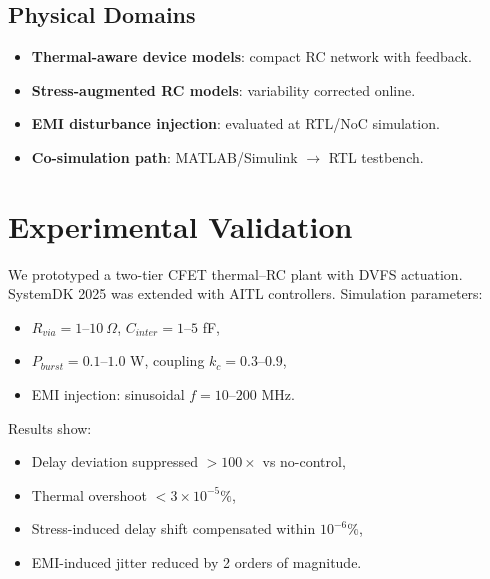 \documentclass[conference]{IEEEtran}
\begin{document}
\subsection{Physical Domains}
\begin{itemize}
  \item \textbf{Thermal-aware device models}: compact RC network with feedback.
  \item \textbf{Stress-augmented RC models}: variability corrected online.
  \item \textbf{EMI disturbance injection}: evaluated at RTL/NoC simulation.
  \item \textbf{Co-simulation path}: MATLAB/Simulink $\to$ RTL testbench.
\end{itemize}

\section{Experimental Validation}
We prototyped a two-tier CFET thermal–RC plant with DVFS actuation.  
SystemDK 2025 was extended with AITL controllers.  
Simulation parameters:
\begin{itemize}
  \item $R_{via}=1\text{--}10~\Omega$, $C_{inter}=1\text{--}5$ fF,
  \item $P_{burst}=0.1\text{--}1.0$ W, coupling $k_c=0.3\text{--}0.9$,
  \item EMI injection: sinusoidal $f=10\text{--}200$ MHz.
\end{itemize}
Results show:
\begin{itemize}
  \item Delay deviation suppressed $>100\times$ vs no-control,
  \item Thermal overshoot $<3\times 10^{-5}\%$,
  \item Stress-induced delay shift compensated within $10^{-6}\%$,
  \item EMI-induced jitter reduced by 2 orders of magnitude.
\end{itemize}
\end{document}
